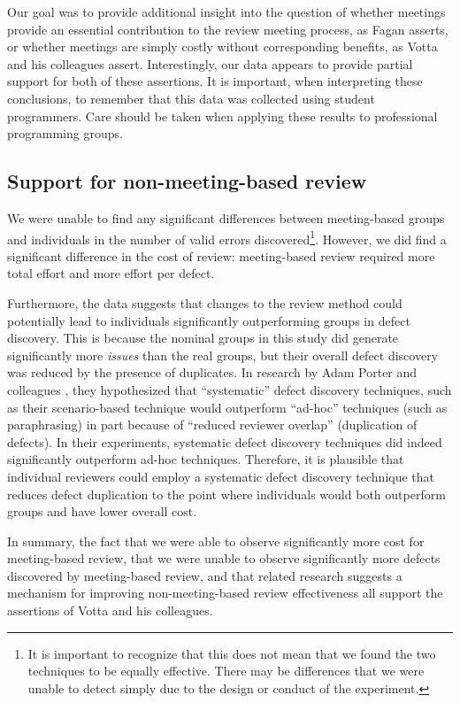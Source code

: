 Our goal was to provide additional insight into the question of whether
meetings provide an essential contribution to the review meeting process,
as Fagan asserts, or whether meetings are simply costly without
corresponding benefits, as Votta and his colleagues assert.  Interestingly,
our data appears to provide partial support for both of these assertions.
It is important, when interpreting these conclusions, to remember
that this data was collected using student programmers. Care should
be taken when applying these results to professional programming 
groups.

\subsection{Support for non-meeting-based review}

We were unable to find any significant differences between meeting-based
groups and individuals in the number of valid errors discovered\footnote{It
  is important to recognize that this does not mean that we found the two
  techniques to be equally effective. There may be differences
  that we were unable to detect simply due to the design or conduct of the
  experiment.}. However, we did find a significant difference in the cost of
review: meeting-based review required more total effort and more effort per
defect.

Furthermore, the data suggests that changes to the review method could
potentially lead to individuals significantly outperforming groups in
defect discovery.  This is because the nominal groups in this study did
generate significantly more {\em issues} than the real groups, but their overall
defect discovery was reduced by the presence of duplicates.  In research by
Adam Porter and colleagues \cite{Porter95}, they hypothesized that
``systematic'' defect discovery techniques, such as their scenario-based
technique would outperform ``ad-hoc'' techniques (such as paraphrasing) in
part because of ``reduced reviewer overlap'' (duplication of defects). In
their experiments, systematic defect discovery techniques did indeed
significantly outperform ad-hoc techniques.  Therefore, it is plausible
that individual reviewers could employ a systematic defect discovery
technique that reduces defect duplication to the point where individuals
would both outperform groups and have lower overall cost. 

In summary, the fact that we were able to observe significantly more cost for
meeting-based review, that we were unable to observe significantly more
defects discovered by meeting-based review, and that related research
suggests a mechanism for improving non-meeting-based review effectiveness
all support the assertions of Votta and his colleagues.

